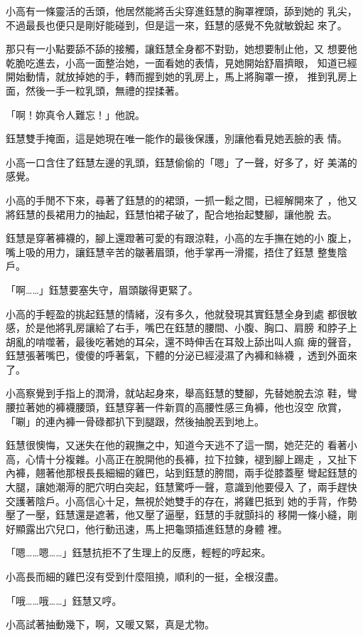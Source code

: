 小高有一條靈活的舌頭，他居然能將舌尖穿進鈺慧的胸罩裡頭，舔到她的
乳尖，不過最長也便只是剛好能碰到，但是這一來，鈺慧的感覺不免就敏銳起
來了。

那只有一小點要舔不舔的接觸，讓鈺慧全身都不對勁，她想要制止他，又
想要他乾脆吃進去，小高一面整治她，一面看她的表情，見她開始舒眉擠眼，
知道已經開始動情，就放掉她的手，轉而握到她的乳房上，馬上將胸罩一撩，
推到乳房上面，然後一手一粒乳頭，無禮的捏揉著。

「啊！妳真令人難忘！」他說。

鈺慧雙手掩面，這是她現在唯一能作的最後保護，別讓他看見她丟臉的表
情。

小高一口含住了鈺慧左邊的乳頭，鈺慧偷偷的「嗯」了一聲，好多了，好
美滿的感覺。

小高的手閒不下來，尋著了鈺慧的的裙頭，一抓一鬆之間，已經解開來了
，他又將鈺慧的長裙用力的抽起，鈺慧怕裙子破了，配合地抬起雙腳，讓他脫
去。

鈺慧是穿著褲襪的，腳上還蹬著可愛的有跟涼鞋，小高的左手撫在她的小
腹上，嘴上吸的用力，讓鈺慧辛苦的皺著眉頭，他手掌再一滑擺，捂住了鈺慧
整隻陰戶。

「啊……」鈺慧要塞失守，眉頭皺得更緊了。

小高的手輕盈的挑起鈺慧的情緒，沒有多久，他就發現其實鈺慧全身到處
都很敏感，於是他將乳房讓給了右手，嘴巴在鈺慧的腰間、小腹、胸口、肩膀
和脖子上胡亂的啃噬著，最後吃著她的耳朵，還不時伸舌在耳殼上舔出叫人痲
痺的聲音，鈺慧張著嘴巴，傻傻的呼著氣，下體的分泌已經浸濕了內褲和絲襪
，透到外面來了。

小高察覺到手指上的潤滑，就站起身來，舉高鈺慧的雙腳，先替她脫去涼
鞋，彎腰拉著她的褲襪腰頭，鈺慧穿著一件新買的高腰性感三角褲，他也沒空
欣賞，「唰」的連內褲一骨碌都扒下到腿跟，然後抽脫丟到地上。

鈺慧很懊悔，又迷失在他的親撫之中，知道今天逃不了這一關，她茫茫的
看著小高，心情十分複雜。小高正在脫開他的長褲，拉下拉鍊，褪到腳上踢走
，又扯下內褲，翹著他那根長長細細的雞巴，站到鈺慧的胯間，兩手從膝蓋壓
彎起鈺慧的大腿，讓她潮溽的肥穴明白突起，鈺慧驚呼一聲，意識到他要侵入
了，兩手趕快交護著陰戶。小高信心十足，無視於她雙手的存在，將雞巴抵到
她的手背，作勢壓了一壓，鈺慧還是遮著，他又壓了逼壓，鈺慧的手就顫抖的
移開一條小縫，剛好顯露出穴兒口，他行動迅速，馬上把龜頭插進鈺慧的身體
裡。

「嗯……嗯……」鈺慧抗拒不了生理上的反應，輕輕的哼起來。

小高長而細的雞巴沒有受到什麼阻撓，順利的一挺，全根沒盡。

「哦……哦……」鈺慧又哼。

小高試著抽動幾下，啊，又暖又緊，真是尤物。

